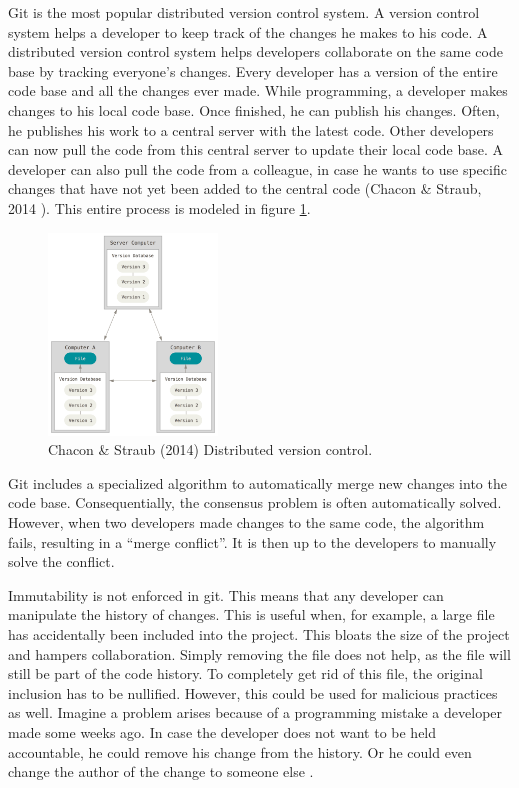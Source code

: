 Git is the most popular distributed version control system. A version control system helps a developer to keep track of the changes he makes to his code. A distributed version control system helps developers collaborate on the same code base by tracking everyone's changes. Every developer has a version of the entire code base and all the changes ever made. While programming, a developer makes changes to his local code base. Once finished, he can publish his changes. Often, he publishes his work to a central server with the latest code. Other developers can now pull the code from this central server to update their local code base. A developer can also pull the code from a colleague, in case he wants to use specific changes that have not yet been added to the central code (Chacon \& Straub, 2014 \cite{git-manual-book}). This entire process is modeled in figure \ref{fig:distributed-vcs}.


\begin{figure}[h]
\centering
\includegraphics[width=0.4\textwidth]{paper-images/distributed.png}
\caption{Chacon \& Straub (2014) Distributed version control.} 
\label{fig:distributed-vcs}
\end{figure}

Git includes a specialized algorithm to automatically merge new changes into the code base. Consequentially, the consensus problem is often automatically solved. However, when two developers made changes to the same code, the algorithm fails, resulting in a ``merge conflict''. It is then up to the developers to manually solve the conflict. 

Immutability is not enforced in git. This means that any developer can manipulate the history of changes. This is useful when, for example, a large file has accidentally been included into the project. This bloats the size of the project and hampers collaboration. Simply removing the file does not help, as the file will still be part of the code history. To completely get rid of this file, the original inclusion has to be nullified. However, this could be used for malicious practices as well. Imagine a problem arises because of a programming mistake a developer made some weeks ago. In case the developer does not want to be held accountable, he could remove his change from the history. Or he could even change the author of the change to someone else \cite{change-author-commit}.

